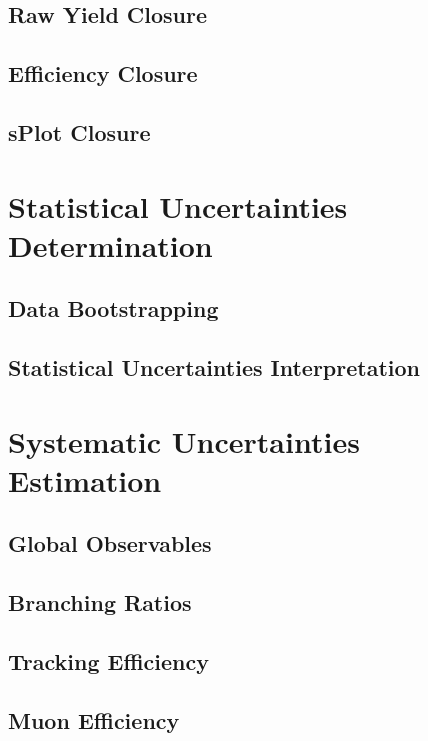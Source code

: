 \subsection{Raw Yield Closure}

\subsection{Efficiency Closure}

\subsection{sPlot Closure}


\section{Statistical Uncertainties Determination} 

\subsection{Data Bootstrapping}

\subsection{Statistical Uncertainties Interpretation}

\section{Systematic Uncertainties Estimation} 

\subsection{Global Observables}

\subsection{Branching Ratios}

\subsection{Tracking Efficiency}

\subsection{Muon Efficiency}

